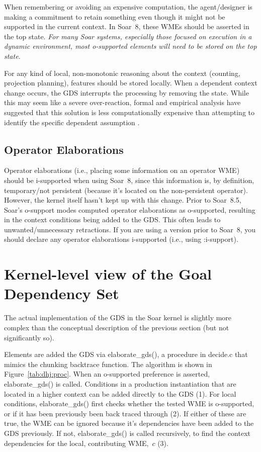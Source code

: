 When remembering or avoiding an expensive computation, the
agent/designer is making a commitment to retain something even though
it might not be supported in the current context.  In Soar~8, these
WMEs should be asserted in the top state.  \emph{For many Soar systems,
especially those focused on execution in a dynamic environment, 
most o-supported elements will need to be stored on the top state.} 

For any kind of local, non-monotonic reasoning about the context
(counting, projection planning), features should be stored locally.
When a dependent context change occurs, the GDS interrupts the
processing by removing the state.  While this may seem like a severe
over-reaction, formal and empirical analysis have suggested that this
solution is less computationally expensive than attempting to identify
the specific dependent assumption \cite{Wray03:Ensuring}.


\subsection*{Operator Elaborations}

Operator elaborations (i.e., placing some information on an operator
WME) should be i-supported when using Soar~8, since this information
is, by definition, temporary/not persistent (because it's located on
the non-persistent operator).  However, the kernel itself hasn't kept
up with this change.  Prior to Soar~8.5, Soar's o-support modes
computed operator elaborations as o-supported, resulting in the
context conditions being added to the GDS.  This often leads to
unwanted/unnecessary retractions.  If you are using a version prior to
Soar~8, you should declare any operator elaborations i-supported (i.e.,
using :i-support).




\section*{Kernel-level view of the Goal Dependency Set}


The actual implementation of the GDS in the Soar kernel is slightly
more complex than the conceptual description of the previous section
(but not significantly so).  

Elements are added the GDS via elaborate\_gds(), a procedure in
decide.c that mimics the chunking backtrace function.  The algorithm
is shown in Figure~\ref{tab:dhj:proc}.  When an o-supported preference
is asserted, elaborate\_gds() is called.  Conditions in a production
instantiation that are located in a higher context can be added
directly to the GDS (1).  For local conditions, elaborate\_gds() first
checks whether the tested WME is o-supported, or if it has been
previously been back traced through (2). If either of these are true,
the WME can be ignored because it's dependencies have been added to
the GDS previously.  If not, elaborate\_gds() is called recursively,
to find the context dependencies for the local, contributing WME,~$c$
(3).

